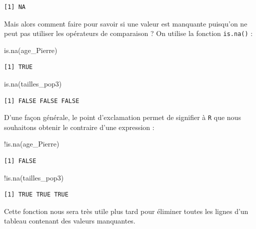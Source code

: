 \documentclass[
  letterpaper,
  DIV=11,
  numbers=noendperiod]{scrreprt}
\newenvironment{Shaded}{\begin{snugshade}}{\end{snugshade}}
\newcommand{\FunctionTok}[1]{\textcolor[rgb]{0.28,0.35,0.67}{#1}}
\newcommand{\NormalTok}[1]{\textcolor[rgb]{0.00,0.23,0.31}{#1}}
\newcommand{\SpecialCharTok}[1]{\textcolor[rgb]{0.37,0.37,0.37}{#1}}
\begin{document}
\begin{verbatim}
[1] NA
\end{verbatim}

Mais alors comment faire pour savoir si une valeur est manquante
puisqu'on ne peut pas utiliser les opérateurs de comparaison ? On
utilise la fonction \texttt{is.na()} :

\begin{Shaded}
\begin{Highlighting}[]
\FunctionTok{is.na}\NormalTok{(age\_Pierre)}
\end{Highlighting}
\end{Shaded}

\begin{verbatim}
[1] TRUE
\end{verbatim}

\begin{Shaded}
\begin{Highlighting}[]
\FunctionTok{is.na}\NormalTok{(tailles\_pop3)}
\end{Highlighting}
\end{Shaded}

\begin{verbatim}
[1] FALSE FALSE FALSE
\end{verbatim}

D'une façon générale, le point d'exclamation permet de signifier à
\texttt{R} que nous souhaitons obtenir le contraire d'une expression :

\begin{Shaded}
\begin{Highlighting}[]
\SpecialCharTok{!}\FunctionTok{is.na}\NormalTok{(age\_Pierre)}
\end{Highlighting}
\end{Shaded}

\begin{verbatim}
[1] FALSE
\end{verbatim}

\begin{Shaded}
\begin{Highlighting}[]
\SpecialCharTok{!}\FunctionTok{is.na}\NormalTok{(tailles\_pop3)}
\end{Highlighting}
\end{Shaded}

\begin{verbatim}
[1] TRUE TRUE TRUE
\end{verbatim}

Cette fonction nous sera très utile plus tard pour éliminer toutes les
lignes d'un tableau contenant des valeurs manquantes.
\end{document}
